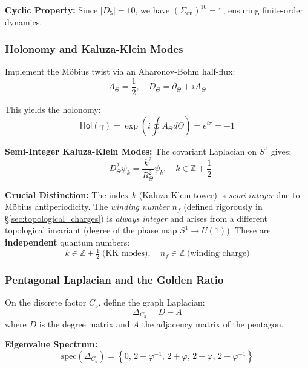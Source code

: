 \documentclass[12pt]{article}
\begin{document}
\textbf{Cyclic Property:} Since $|D_5| = 10$, we have $(\Sigma_{\text{on}})^{10} = \mathbb{1}$, ensuring finite-order dynamics.

\subsubsection{Holonomy and Kaluza-Klein Modes}

Implement the M\"obius twist via an Aharonov-Bohm half-flux:
\begin{equation}
A_\Theta = \frac{1}{2}, \quad D_\Theta = \partial_\Theta + iA_\Theta
\end{equation}

This yields the holonomy:
\begin{equation}
\mathsf{Hol}(\gamma) = \exp\left(i \oint A_\Theta d\Theta\right) = e^{i\pi} = -1
\end{equation}

\textbf{Semi-Integer Kaluza-Klein Modes:} The covariant Laplacian on $S^1$ gives:
\begin{equation}
-D_\Theta^2 \psi_k = \frac{k^2}{R_\Theta^2} \psi_k, \quad k \in \mathbb{Z} + \frac{1}{2}
\end{equation}

\textbf{Crucial Distinction:} The index $k$ (Kaluza-Klein tower) is \emph{semi-integer} due to M\"obius antiperiodicity. The \emph{winding number} $n_f$ (defined rigorously in \S\ref{sec:topological_charges}) is \emph{always integer} and arises from a different topological invariant (degree of the phase map $S^1 \to U(1)$). These are \textbf{independent} quantum numbers:
\begin{equation}
\boxed{k \in \mathbb{Z} + \tfrac{1}{2} \;\text{(KK modes)}, \quad n_f \in \mathbb{Z} \;\text{(winding charge)}}
\end{equation}

\subsubsection{Pentagonal Laplacian and the Golden Ratio}

On the discrete factor $C_5$, define the graph Laplacian:
\begin{equation}
\Delta_{C_5} = D - A
\end{equation}
where $D$ is the degree matrix and $A$ the adjacency matrix of the pentagon.

\textbf{Eigenvalue Spectrum:}
\begin{equation}
\boxed{\text{spec}(\Delta_{C_5}) = \left\{0,\, 2 - \varphi^{-1},\, 2 + \varphi,\, 2 + \varphi,\, 2 - \varphi^{-1}\right\}}
\end{equation}
\end{document}
